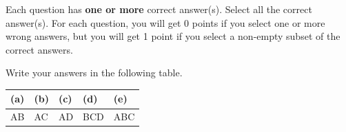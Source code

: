 Each question has \textbf{one or more} correct answer(s). Select all the correct answer(s). For each question, you will get 0 points if you select one or more wrong answers, but you will get 1 point if you select a non-empty subset of the correct answers.

Write your answers in the following table.

\begin{table}[htbp]
    \centering
    \begin{tabular}{|p{2cm}|p{2cm}|p{2cm}|p{2cm}|p{2cm}|}
        \hline
        (a) & (b) & (c) & (d) & (e)\\
        \hline
		  AB & AC & AD &  BCD  & ABC \\
        \hline
    \end{tabular}
\end{table}


